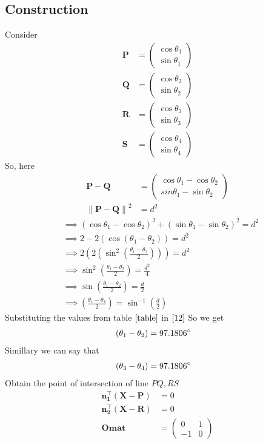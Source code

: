 \documentclass[10pt]{article}
\providecommand{\brak}[1]{\ensuremath{\left(#1\right)}}
\providecommand{\norm}[1]{\left\lVert#1\right\rVert}
\newcommand{\myvec}[1]{\ensuremath{\begin{pmatrix}#1\end{pmatrix}}}
\let\vec\mathbf
\begin{document}
\begin{enumerate}
\section*{\large Construction}
Consider
\begin{eqnarray}
\vec{P}&=\myvec{\cos \theta_1\\\sin \theta_1}
\\
\vec{Q}&=\myvec{\cos \theta_2\\\sin \theta_2}
\\
\vec{R}&=\myvec{\cos \theta_3\\\sin \theta_3}
\\
\vec{S}&=\myvec{\cos \theta_4\\\sin \theta_4}
\end{eqnarray}\label{table1}
So, here
\begin{align}
	\vec{P}-\vec{Q}&=\myvec{\cos\theta_1-\cos\theta_2\\{sin \theta_1}-{\sin \theta_2}}
	\\
\norm{\vec{P}-\vec{Q}}^2&=d^2
\end{align}
		\begin{align}
	&\implies\brak{\cos \theta_1-\cos \theta_2}^2+\brak{\sin \theta_1-\sin \theta_2}^2=d^2\\
	&\implies2-2\brak{\cos\brak{\theta_1-\theta_2}}=d^2\\
	&\implies2\brak{2\brak{{\sin^2}\brak{\frac{\theta_1-\theta_2}{2}}}}=d^2\\
	&\implies\sin^2\brak{\frac{\theta_1-\theta_2}{2}}=\frac{d^2}{4}\\
	&\implies\sin\brak{\frac{\theta_1-\theta_2}{2}}=\frac{d}{2}\\
&\implies\brak{\frac{\theta_1-\theta_2}{2}}=\sin^{-1}\brak{\frac{d}{2}}\label{12}
	\end{align}
	Substituting the values from table $\eqref{table}$ in $\eqref{12}$ So we get
	\begin{align}
	\brak{\theta_1-\theta_2}&=97.1806\degree
	\end{align}
Simillary we can say that
\begin{align}
	\brak{\theta_3-\theta_4}&=97.1806\degree 		       
\end{align}
Obtain the point of intersection of line $PQ,RS$
\begin{align}
\vec{{n}_1^{\top}}\brak{\vec{X}-\vec{P}}&=0\\
\vec{{n}_2^{\top}}\brak{\vec{X}-\vec{R}}&=0\\
\vec{Omat}&=\myvec{0&1\\-1&0}\\

\end{align}
\end{enumerate}
\end{document}
